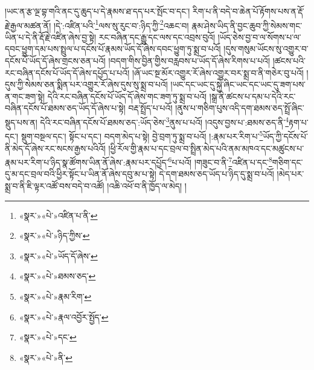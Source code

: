 །ཡང་ན་རྩ་ལྔ་བྷ་གའི་ནང་དུ་ཆུད་པ་དེ་རྣམས་ཐ་དད་པར་སྤོང་བ་དང་། རིག་པ་ནི་བདེ་བ་ཆེན་པོ་རྟོགས་པས་ན་རྡོ་རྗེ་རྒྱལ་མཚན་ནོ། །དེ་:འཛིན་པའི་\footnote{«སྣར་»«པེ་»འཛིན་པ་ནི་}ལས་སུ་རུང་བ་:ཉིད་ཀྱི་\footnote{«སྣར་»«པེ་»ཉིད་ཀྱིས་}འཆང་བ། རྣམ་ཤེས་ཡིད་ནི་བྱང་ཆུབ་ཀྱི་སེམས་གང་ཡིན་པ་དེ་ནི་རྡོ་རྗེ་འཛིན་ཞེས་བྱ་སྟེ། རང་བཞིན་དང་རྒྱུ་དང་ལས་དང་འབྲས་བུའོ། །ཡོད་ཅེས་བྱ་བ་ལ་སོགས་པ་ལ་དབང་ཕྱུག་དམ་པས་སྤྲུལ་པ་དངོས་པོ་རྣམས་ཡོད་དོ་ཞེས་དབང་ཕྱུག་ཏུ་སྨྲ་བ་པའོ། །དུས་གསུམ་ཡོངས་སུ་འགྱུར་བ་དངོས་པོ་ཡོད་དོ་ཞེས་གྲངས་ཅན་པའོ། །བདག་གིས་བྱིན་གྱིས་བརླབས་པ་ཡོད་དོ་ཞེས་རིགས་པ་པའོ། །ཚངས་པའི་རང་བཞིན་དངོས་པོ་ཡོད་དོ་ཞེས་དཔྱོད་པ་པའོ། །ཞོ་ཡང་སྔ་མོར་འགྱུར་རོ་ཞེས་འགྱུར་བར་སྨྲ་བ་ནི་གཅེར་བུ་པའོ། །དུས་ཀྱི་སེམས་ཅན་སྨིན་པར་འགྱུར་རོ་ཞེས་དུས་སུ་སྨྲ་བ་པའོ། །ཡང་དང་ཡང་དུ་སྐྱེ་ཞིང་ཡང་དང་ཡང་དུ་ཟག་པས་ན་གང་ཟག་སྟེ། དེའི་རང་བཞིན་དངོས་པོ་ཡོད་དོ་ཞེས་གང་ཟག་ཏུ་སྨྲ་བ་པའོ། །སྒྲ་ནི་ཚངས་པ་དམ་པ་དེའི་རང་བཞིན་དངོས་པོ་ཐམས་ཅད་ཡོད་དོ་ཞེས་པ་སྟེ། བརྡ་སྤྲོད་པ་པའོ། །ནུས་པ་གཅིག་པུས་འདི་དག་ཐམས་ཅད་སྤྲོ་ཞིང་སྡུད་པས་ན། དེའི་རང་བཞིན་དངོས་པོ་ཐམས་ཅད་:ཡོད་ཅེས་\footnote{«སྣར་»«པེ་»ཡོད་དོ་ཞེས་}ནུས་པ་པའོ། །འདུས་བྱས་པ་:ཐམས་ཅད་ནི་\footnote{«སྣར་»«པེ་»ཐམས་ཅད་}རྟག་པ་དང་། སྡུག་བསྔལ་དང་། སྟོང་པ་དང་། བདག་མེད་པ་སྟེ། བྱེ་བྲག་ཏུ་སྨྲ་བ་པའོ། །:རྣམ་པར་རིག་པ་\footnote{«སྣར་»«པེ་»རྣམ་རིག་}ཡོད་ཀྱི་དངོས་པོ་ནི་མེད་དོ་ཞེས་རང་སངས་རྒྱས་པའིའོ། །ཕྱི་རོལ་གྱི་རྣམ་པ་དང་བྲལ་བ་སྤྲིན་མེད་པའི་ནམ་མཁའ་དང་མཚུངས་པ་རྣམ་པར་རིག་པ་ཉིད་སྣ་ཚོགས་ཡིན་ནོ་ཞེས་:རྣམ་པར་དཔྱོད་\footnote{«སྣར་»«པེ་»རྣལ་འབྱོར་སྤྱོད་}པ་པའོ། །གཟུང་བ་ནི་\footnote{«སྣར་»«པེ་»དང་}འཛིན་པ་དང་\footnote{«སྣར་»«པེ་»ནི་}གཅིག་དང་དུ་མ་དང་བྲལ་བའི་ཕྱིར་སྟོང་པ་ཡིན་ནོ་ཞེས་དབུ་མ་པ་སྟེ། དེ་དག་ཐམས་ཅད་ཡོད་པ་ཉིད་དུ་སྨྲ་བ་པའོ། །མེད་པར་སྨྲ་བ་ནི་ཇི་ལྟར་འཚོ་བས་བདེ་བ་འཚོ། །འཆི་འཕོ་བ་ནི་ཁྱོད་ལ་མེད། །
